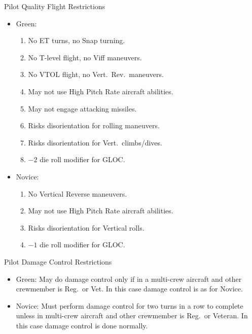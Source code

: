 \begin{table}

\centering

\caption{Pilot Quality Flight Restrictions}
\medskip

\begin{minipage}{1.0\linewidth}
\begin{itemize}[nosep]
    \item Green:
        \begin{enumerate}
            \item No ET turns, no Snap turning.
            \item No T-level flight, no Viff maneuvers.
            \item No VTOL flight, no Vert.\ Rev.\ maneuvers.
            \item May not use High Pitch Rate aircraft abilities.
            \item May not engage attacking missiles.
            \item Risks disorientation for rolling maneuvers.
            \item Risks disorientation for Vert.\ climbs/dives.
            \item $-2$ die roll modifier for GLOC.
        \end{enumerate}
    \item Novice:
        \begin{enumerate}
            \item No Vertical Reverse maneuvers.
            \item May not use High Pitch Rate aircraft abilities.
            \item Risks disorientation for Vertical rolls.
            \item $-1$ die roll modifier for GLOC.
        \end{enumerate}
    \end{itemize}
\end{minipage}

\bigskip

\caption{Pilot Damage Control Restrictions}
\medskip

\begin{minipage}{1.0\linewidth}
\begin{itemize}[nosep]
    \item Green: May do damage control only if in a multi-crew aircraft and other crewmember is Reg.\ or Vet. In this case damage control is as for Novice.
    \item Novice: Must perform damage control for two turns in a row to complete unless in multi-crew aircraft and other crewmember is Reg.\ or Veteran. In this case damage control is done normally.
    \end{itemize}
\end{minipage}


\end{table}
